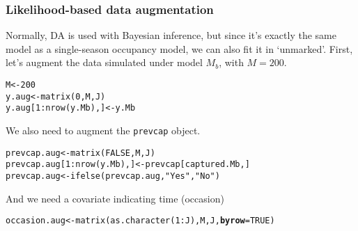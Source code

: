 \documentclass[color=usenames,dvipsnames]{beamer}\usepackage[]{graphicx}\usepackage[]{color}
\makeatletter
\newcommand{\hlnum}[1]{\textcolor[rgb]{0.69,0.494,0}{#1}}%
\newcommand{\hlstr}[1]{\textcolor[rgb]{0.749,0.012,0.012}{#1}}%
\newcommand{\hlopt}[1]{\textcolor[rgb]{0,0,0}{#1}}%
\newcommand{\hlstd}[1]{\textcolor[rgb]{0,0,0}{#1}}%
\newcommand{\hlkwb}[1]{\textcolor[rgb]{0,0.341,0.682}{#1}}%
\newcommand{\hlkwc}[1]{\textcolor[rgb]{0,0,0}{\textbf{#1}}}%
\newcommand{\hlkwd}[1]{\textcolor[rgb]{0.004,0.004,0.506}{#1}}%
\newenvironment{kframe}{%
 \def\at@end@of@kframe{}%
 \ifinner\ifhmode%
  \def\at@end@of@kframe{\end{minipage}}%
  \begin{minipage}{\columnwidth}%
 \fi\fi%
 \def\FrameCommand##1{\hskip\@totalleftmargin \hskip-\fboxsep
 \colorbox{shadecolor}{##1}\hskip-\fboxsep
     \hskip-\linewidth \hskip-\@totalleftmargin \hskip\columnwidth}%
 \MakeFramed {\advance\hsize-\width
   \@totalleftmargin\z@ \linewidth\hsize
   \@setminipage}}%
 {\par\unskip\endMakeFramed%
 \at@end@of@kframe}
\newenvironment{knitrout}{}{} %
\newcommand{\inr}[1]{\colorbox{inlinecolor}{\texttt{#1}}}
\makeatother
\begin{document}
\begin{frame}[fragile]
  \frametitle{Likelihood-based data augmentation}
  \small
  Normally, DA is used with Bayesian inference, but since it's exactly
  the same model as a single-season occupancy model, we can also fit
  it in `unmarked'.
  \pause
  \vfill
  First, let's augment the data simulated under model $M_b$, with
  $M=200$.
\vspace{-6pt}
\begin{knitrout}\scriptsize
{}\color{fgcolor}\begin{kframe}
\begin{alltt}
\hlstd{M} \hlkwb{<-} \hlnum{200}
\hlstd{y.aug} \hlkwb{<-} \hlkwd{matrix}\hlstd{(}\hlnum{0}\hlstd{, M, J)}
\hlstd{y.aug[}\hlnum{1}\hlopt{:}\hlkwd{nrow}\hlstd{(y.Mb),]} \hlkwb{<-} \hlstd{y.Mb}
\end{alltt}
\end{kframe}
\end{knitrout}
\pause
\vfill
We also need to augment the \inr{prevcap} object.
\vspace{-6pt}
\begin{knitrout}\scriptsize
{}\color{fgcolor}\begin{kframe}
\begin{alltt}
\hlstd{prevcap.aug} \hlkwb{<-} \hlkwd{matrix}\hlstd{(}\hlnum{FALSE}\hlstd{, M, J)}
\hlstd{prevcap.aug[}\hlnum{1}\hlopt{:}\hlkwd{nrow}\hlstd{(y.Mb),]} \hlkwb{<-} \hlstd{prevcap[captured.Mb,]}
\hlstd{prevcap.aug} \hlkwb{<-} \hlkwd{ifelse}\hlstd{(prevcap.aug,} \hlstr{"Yes"}\hlstd{,} \hlstr{"No"}\hlstd{)}
\end{alltt}
\end{kframe}
\end{knitrout}
And we need a covariate indicating time (occasion)
\vspace{-6pt}
\begin{knitrout}\scriptsize
{}\color{fgcolor}\begin{kframe}
\begin{alltt}
\hlstd{occasion.aug} \hlkwb{<-} \hlkwd{matrix}\hlstd{(}\hlkwd{as.character}\hlstd{(}\hlnum{1}\hlopt{:}\hlstd{J), M, J,} \hlkwc{byrow}\hlstd{=}\hlnum{TRUE}\hlstd{)}
\end{alltt}
\end{kframe}
\end{knitrout}
\end{frame}
\end{document}
